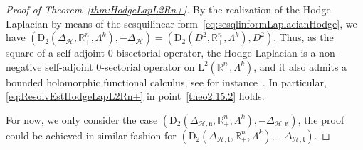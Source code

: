 \documentclass[10pt]{amsart}
\theoremstyle{definition}\newtheorem{defi}[theo]{Definition}\newtheorem{rema}[theo]{Remark}\newtheorem{exam}[theo]{Example}\newtheorem{exem}[theo]{Example}\newtheorem{nota}[theo]{Notation}
\newcommand{\bbR}{\mathbb{R}}
\newcommand{\rmD}{\mathrm{D}}
\newcommand{\rmL}{\mathrm{L}}
\newcommand{\clH}{\mathcal{H}}
\newcommand{\fkn}{\mathfrak{n}}
\newcommand{\fkt}{\mathfrak{t}}
\begin{document}
\begin{proof}[{Proof of Theorem~\ref{thm:HodgeLapL2Rn+}}] 
By the realization of the Hodge Laplacian by means of the sesquilinear form~\eqref{eq:sesqlinformLaplacianHodge}, we have $(\rmD_2(\Delta_\clH,\bbR^n_+,\Lambda^k),-\Delta_\clH) = (\rmD_2(D_\cdot^2,\bbR^n_+,\Lambda^k),D_\cdot^2)$. Thus, as the square of a self-adjoint $0$-bisectorial operator, the Hodge Laplacian is a non-negative self-adjoint $0$-sectorial operator on $\rmL^2(\bbR^n_+,\Lambda^k)$, and it also admits a bounded holomorphic functional calculus, see for instance~\cite[Theorem~3.2.20]{EgertPhDThesis2015}. In particular, \eqref{eq:ResolvEstHodgeLapL2Rn+} in point~\eqref{theo2.15.2} holds.

For now, we only consider the case $(\rmD_2(\Delta_{\clH,\fkn},\bbR^n_+,\Lambda^k),-\Delta_{\clH,\fkn})$, the proof could be achieved in similar fashion for $(\rmD_2(\Delta_{\clH,\fkt},\bbR^n_+,\Lambda^k),-\Delta_{\clH,\fkt})$.


\end{proof}
\end{document}
